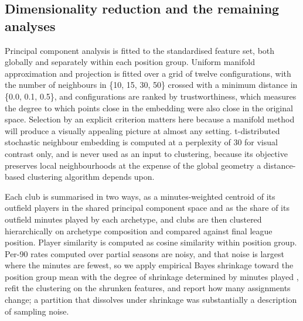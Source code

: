\subsection{Dimensionality reduction and the remaining analyses}

Principal component analysis is fitted to the standardised feature set, both globally and
separately within each position group. Uniform manifold approximation and projection
\citep{mcinnes2018umap} is fitted over a grid of twelve configurations, with the number of
neighbours in \{10, 15, 30, 50\} crossed with a minimum distance in \{0.0, 0.1, 0.5\}, and
configurations are ranked by trustworthiness, which measures the degree to which points close in
the embedding were also close in the original space. Selection by an explicit criterion matters
here because a manifold method will produce a visually appealing picture at almost any setting.
t-distributed stochastic neighbour embedding \citep{vandermaaten2008visualizing} is computed at a
perplexity of 30 for visual contrast only, and is never used as an input to clustering, because
its objective preserves local neighbourhoods at the expense of the global geometry a
distance-based clustering algorithm depends upon.

Each club is summarised in two ways, as a minutes-weighted centroid of its outfield players in
the shared principal component space and as the share of its outfield minutes played by each
archetype, and clubs are then clustered hierarchically on archetype composition and compared
against final league position. Player similarity is computed as cosine similarity within position
group. Per-90 rates computed over partial seasons are noisy, and that noise is largest where the
minutes are fewest, so we apply empirical Bayes shrinkage toward the position group mean with the
degree of shrinkage determined by minutes played \citep{efron1977steins}, refit the clustering on
the shrunken features, and report how many assignments change; a partition that dissolves under
shrinkage was substantially a description of sampling noise.
